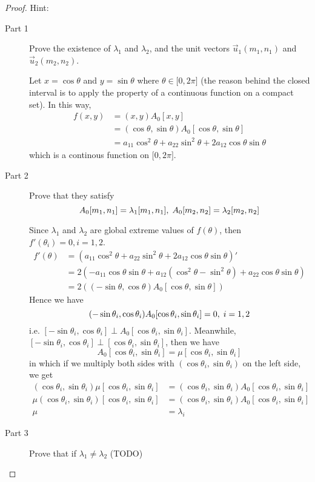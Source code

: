 \documentclass[onecolumn]{ctexart}
\begin{document}
\begin{proof}
  Hint:
  \begin{description}
    \item[Part 1] Prove the existence of $\lambda_1$ and $\lambda_2$, and the 
    unit vectors $\vec{u}_1(m_1, n_1)$ and $\vec{u}_2(m_2, n_2)$.

    Let $x = \cos\theta$ and $y = \sin\theta$ where $\theta \in \lbrack 0, 2\pi 
    \rbrack$ (the reason behind the closed interval is to apply the property of 
    a continuous function on a compact set). In this way, 
    \[
      \begin{split}
        f(x, y) &= (x, y)A_0[x, y] \\
                &= (\cos\theta, \sin\theta)A_0[\cos\theta, \sin\theta] \\
                &= a_{11}\cos^2\theta + a_{22}\sin^2\theta + 2a_{12}\cos\theta\sin\theta
      \end{split}
    \]
    which is a continous function on $\lbrack 0, 2\pi \rbrack$.
    \item[Part 2] Prove that they satisfy
    \[
      A_0[m_1, n_1] = \lambda_1[m_1, n_1],\thickspace A_0[m_2, n_2] = \lambda_2[m_2, n_2]
    \]

    Since $\lambda_1$ and $\lambda_2$ are global extreme values of $f(\theta)$, 
    then $f'(\theta_i) = 0, i=1,2$.
    \[
      \begin{split}
        f'(\theta) &= (a_{11}\cos^2\theta + a_{22}\sin^2\theta + 2a_{12}\cos\theta\sin\theta)' \\
                   &= 2(-a_{11}\cos\theta\sin\theta + a_{12}(\cos^2\theta - \sin^2\theta) + a_{22}\cos\theta\sin\theta) \\
                   &= 2((-\sin\theta, \cos\theta)A_0[\cos\theta, \sin\theta])
      \end{split}
    \]
    Hence we have
    \[
      (-\sin\theta_i, \cos\theta_i)A_0[\cos\theta_i, \sin\theta_i] = 0, \thickspace i=1,2
    \]
    i.e. $[-\sin\theta_i, \cos\theta_i] \perp A_0[\cos\theta_i, \sin\theta_i]$. 
    Meanwhile, $[-\sin\theta_i, \cos\theta_i] \perp [\cos\theta_i, \sin\theta_i]$,
    then we have
    \[
      A_0[\cos\theta_i, \sin\theta_i] = \mu [\cos\theta_i, \sin\theta_i]
    \]
    in which if we multiply both sides with $(\cos\theta_i, \sin\theta_i)$ on the 
    left side, we get
    \[
      \begin{split}
        (\cos\theta_i, \sin\theta_i)\mu[\cos\theta_i, \sin\theta_i] &= (\cos\theta_i, \sin\theta_i)A_0[\cos\theta_i, \sin\theta_i] \\
        \mu(\cos\theta_i, \sin\theta_i)[\cos\theta_i, \sin\theta_i] &= (\cos\theta_i, \sin\theta_i)A_0[\cos\theta_i, \sin\theta_i] \\
        \mu &= \lambda_i
      \end{split}
    \]
    \item[Part 3] Prove that if $\lambda_1 \neq \lambda_2$ (TODO)
  \end{description}
\end{proof}
\end{document}
